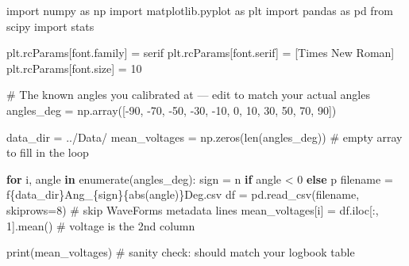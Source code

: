 \documentclass[
  12pt,
  letterpaper,
]{article}
\newenvironment{Shaded}{\begin{snugshade}}{\end{snugshade}}
\newcommand{\BuiltInTok}[1]{\textcolor[rgb]{0.00,0.23,0.31}{#1}}
\newcommand{\CommentTok}[1]{\textcolor[rgb]{0.37,0.37,0.37}{#1}}
\newcommand{\ControlFlowTok}[1]{\textcolor[rgb]{0.00,0.23,0.31}{\textbf{#1}}}
\newcommand{\DecValTok}[1]{\textcolor[rgb]{0.68,0.00,0.00}{#1}}
\newcommand{\ImportTok}[1]{\textcolor[rgb]{0.00,0.46,0.62}{#1}}
\newcommand{\KeywordTok}[1]{\textcolor[rgb]{0.00,0.23,0.31}{\textbf{#1}}}
\newcommand{\NormalTok}[1]{\textcolor[rgb]{0.00,0.23,0.31}{#1}}
\newcommand{\OperatorTok}[1]{\textcolor[rgb]{0.37,0.37,0.37}{#1}}
\newcommand{\SpecialCharTok}[1]{\textcolor[rgb]{0.37,0.37,0.37}{#1}}
\newcommand{\SpecialStringTok}[1]{\textcolor[rgb]{0.13,0.47,0.30}{#1}}
\newcommand{\StringTok}[1]{\textcolor[rgb]{0.13,0.47,0.30}{#1}}
\begin{document}
\begin{Shaded}
\begin{Highlighting}[]
\ImportTok{import}\NormalTok{ numpy }\ImportTok{as}\NormalTok{ np}
\ImportTok{import}\NormalTok{ matplotlib.pyplot }\ImportTok{as}\NormalTok{ plt}
\ImportTok{import}\NormalTok{ pandas }\ImportTok{as}\NormalTok{ pd}
\ImportTok{from}\NormalTok{ scipy }\ImportTok{import}\NormalTok{ stats}

\NormalTok{plt.rcParams[}\StringTok{\textquotesingle{}font.family\textquotesingle{}}\NormalTok{] }\OperatorTok{=} \StringTok{\textquotesingle{}serif\textquotesingle{}}
\NormalTok{plt.rcParams[}\StringTok{\textquotesingle{}font.serif\textquotesingle{}}\NormalTok{] }\OperatorTok{=}\NormalTok{ [}\StringTok{\textquotesingle{}Times New Roman\textquotesingle{}}\NormalTok{]}
\NormalTok{plt.rcParams[}\StringTok{\textquotesingle{}font.size\textquotesingle{}}\NormalTok{] }\OperatorTok{=} \DecValTok{10}

\CommentTok{\# The known angles you calibrated at — edit to match your actual angles}
\NormalTok{angles\_deg }\OperatorTok{=}\NormalTok{ np.array([}\OperatorTok{{-}}\DecValTok{90}\NormalTok{, }\OperatorTok{{-}}\DecValTok{70}\NormalTok{, }\OperatorTok{{-}}\DecValTok{50}\NormalTok{, }\OperatorTok{{-}}\DecValTok{30}\NormalTok{, }\OperatorTok{{-}}\DecValTok{10}\NormalTok{, }\DecValTok{0}\NormalTok{, }\DecValTok{10}\NormalTok{, }\DecValTok{30}\NormalTok{, }\DecValTok{50}\NormalTok{, }\DecValTok{70}\NormalTok{, }\DecValTok{90}\NormalTok{])}

\NormalTok{data\_dir }\OperatorTok{=} \StringTok{\textquotesingle{}../Data/\textquotesingle{}}
\NormalTok{mean\_voltages }\OperatorTok{=}\NormalTok{ np.zeros(}\BuiltInTok{len}\NormalTok{(angles\_deg))   }\CommentTok{\# empty array to fill in the loop}

\ControlFlowTok{for}\NormalTok{ i, angle }\KeywordTok{in} \BuiltInTok{enumerate}\NormalTok{(angles\_deg):}
\NormalTok{    sign }\OperatorTok{=} \StringTok{\textquotesingle{}n\textquotesingle{}} \ControlFlowTok{if}\NormalTok{ angle }\OperatorTok{\textless{}} \DecValTok{0} \ControlFlowTok{else} \StringTok{\textquotesingle{}p\textquotesingle{}}
\NormalTok{    filename }\OperatorTok{=} \SpecialStringTok{f\textquotesingle{}}\SpecialCharTok{\{}\NormalTok{data\_dir}\SpecialCharTok{\}}\SpecialStringTok{Ang\_}\SpecialCharTok{\{}\NormalTok{sign}\SpecialCharTok{\}\{}\BuiltInTok{abs}\NormalTok{(angle)}\SpecialCharTok{\}}\SpecialStringTok{Deg.csv\textquotesingle{}}
\NormalTok{    df }\OperatorTok{=}\NormalTok{ pd.read\_csv(filename, skiprows}\OperatorTok{=}\DecValTok{8}\NormalTok{)   }\CommentTok{\# skip WaveForms metadata lines}
\NormalTok{    mean\_voltages[i] }\OperatorTok{=}\NormalTok{ df.iloc[:, }\DecValTok{1}\NormalTok{].mean()  }\CommentTok{\# voltage is the 2nd column}

\BuiltInTok{print}\NormalTok{(mean\_voltages)   }\CommentTok{\# sanity check: should match your logbook table}
\end{Highlighting}
\end{Shaded}
\end{document}
